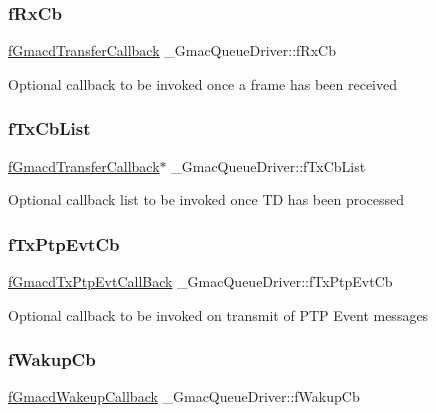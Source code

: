\subsubsection{\texorpdfstring{fRxCb}{fRxCb}}
{\footnotesize\ttfamily \mbox{\hyperlink{group__gmacd__types_ga64979042bf43f697de166e864e3259de}{f\+Gmacd\+Transfer\+Callback}} \+\_\+\+Gmac\+Queue\+Driver\+::f\+Rx\+Cb}

Optional callback to be invoked once a frame has been received \mbox{\label{struct__GmacQueueDriver_adbff7af552894aab8a3262b07d033976}} 
\subsubsection{\texorpdfstring{fTxCbList}{fTxCbList}}
{\footnotesize\ttfamily \mbox{\hyperlink{group__gmacd__types_ga64979042bf43f697de166e864e3259de}{f\+Gmacd\+Transfer\+Callback}}$\ast$ \+\_\+\+Gmac\+Queue\+Driver\+::f\+Tx\+Cb\+List}

Optional callback list to be invoked once TD has been processed \mbox{\label{struct__GmacQueueDriver_a583be207a73dc1b281192996aa2dbfa8}} 
\subsubsection{\texorpdfstring{fTxPtpEvtCb}{fTxPtpEvtCb}}
{\footnotesize\ttfamily \mbox{\hyperlink{group__gmacd__types_gad3329dfe65f5877f50ee8a4fd8e63f08}{f\+Gmacd\+Tx\+Ptp\+Evt\+Call\+Back}} \+\_\+\+Gmac\+Queue\+Driver\+::f\+Tx\+Ptp\+Evt\+Cb}

Optional callback to be invoked on transmit of P\+TP Event messages \mbox{\label{struct__GmacQueueDriver_af4818e868c61199911223c4f104b96f3}} 
\subsubsection{\texorpdfstring{fWakupCb}{fWakupCb}}
{\footnotesize\ttfamily \mbox{\hyperlink{group__gmacd__types_ga44e6be4bb53db0660baf6cb50b20a684}{f\+Gmacd\+Wakeup\+Callback}} \+\_\+\+Gmac\+Queue\+Driver\+::f\+Wakup\+Cb}


